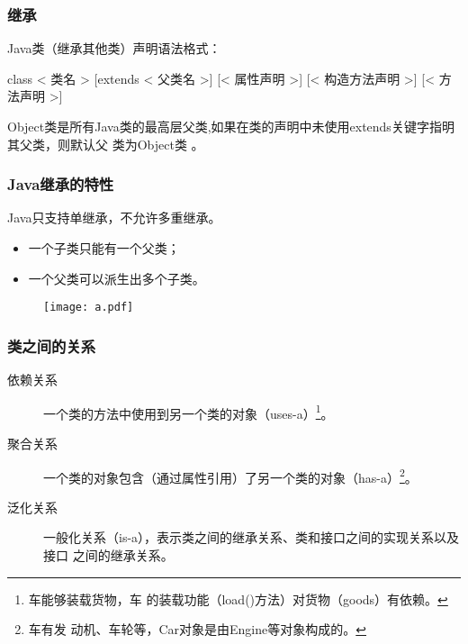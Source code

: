 \begin{frame}[fragile] %
\frametitle{继承}

Java类（继承其他类）声明语法格式：

\begin{javaCode}
  [< 修饰符 >] class < 类名 > [extends < 父类名 >] {
    [< 属性声明 >]
    [< 构造方法声明 >]
    [< 方法声明 >]
  }
\end{javaCode}

Object类是所有Java类的最高层父类,如果在类的声明中未使用extends关键字指明其父类，则默认父
类为Object类 。
\end{frame}

\begin{frame}[fragile] %
\frametitle{Java继承的特性}

Java只支持单继承，不允许多重继承。

\begin{itemize}
\item 一个子类只能有一个父类；
\item 一个父类可以派生出多个子类。
\end{itemize}

\begin{figure}
\centering
\texttt{[image: a.pdf]}
\end{figure}
\end{frame}



\begin{frame}[fragile] %
\frametitle{类之间的关系}

\begin{description}
\item[依赖关系] 一个类的方法中使用到另一个类的对象（uses-a）\footnote{车能够装载货物，车
    的装载功能（load()方法）对货物（goods）有依赖。}。
\item[聚合关系] 一个类的对象包含（通过属性引用）了另一个类的对象（has-a）\footnote{车有发
    动机、车轮等，Car对象是由Engine等对象构成的。}。
\item[泛化关系] 一般化关系（is-a），表示类之间的继承关系、类和接口之间的实现关系以及接口
  之间的继承关系。
\end{description}
\end{frame}

